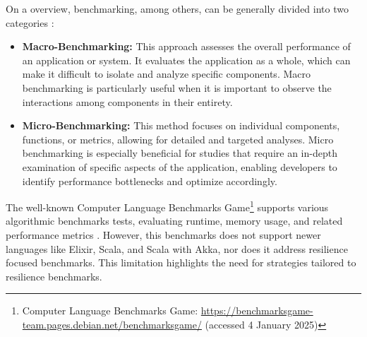 On a overview, benchmarking, among others, can be generally divided into two categories \cite{Imam2014,Blessing2019,Valkov2018,Almeida2013}:
\begin{itemize}
    \item \textbf{Macro-Benchmarking:} This approach assesses the overall performance of an application or system. It evaluates the application as a whole, which can make it difficult to isolate and analyze specific components. Macro benchmarking is particularly useful when it is important to observe the interactions among components in their entirety.
    \item \textbf{Micro-Benchmarking:} This method focuses on individual components, functions, or metrics, allowing for detailed and targeted analyses. Micro benchmarking is especially beneficial for studies that require an in-depth examination of specific aspects of the application, enabling developers to identify performance bottlenecks and optimize accordingly.
\end{itemize}

The well-known Computer Language Benchmarks Game\footnote{Computer Language Benchmarks Game: \url{https://benchmarksgame-team.pages.debian.net/benchmarksgame/} (accessed 4 January 2025)} supports various algorithmic benchmarks tests, evaluating runtime, memory usage, and related performance metrics \cite{Blessing2019}. However, this benchmarks does not support newer languages like Elixir, Scala, and Scala with Akka, nor does it address resilience focused benchmarks. This limitation highlights the need for strategies tailored to resilience benchmarks.

